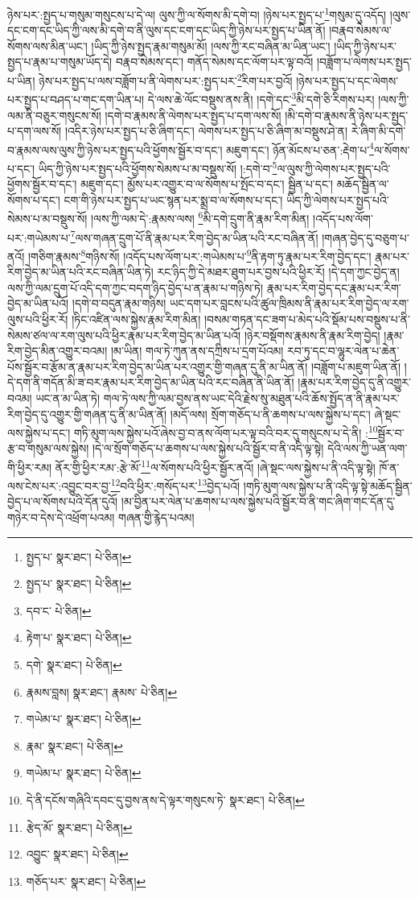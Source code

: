 ཉེས་པར་:སྤྱད་པ་གསུམ་གསུངས་པ་དེ་ལ། ལུས་ཀྱི་ལ་སོགས་མི་དགེ་བ། །ཉེས་པར་སྤྱད་པ་\footnote{སྤྱད་པ་  སྣར་ཐང་།  པེ་ཅིན། }གསུམ་དུ་འདོད། །ལུས་དང་ངག་དང་ཡིད་ཀྱི་ལས་མི་དགེ་བ་ནི་ལུས་དང་ངག་དང་ཡིད་ཀྱི་ཉེས་པར་སྤྱད་པ་ཡིན་ནོ། །བརྣབ་སེམས་ལ་སོགས་ལས་མིན་ཡང་། །ཡིད་ཀྱི་ཉེས་སྤྱད་རྣམ་གསུམ་མོ། །ལས་ཀྱི་རང་བཞིན་མ་ཡིན་ཡང་། །ཡིད་ཀྱི་ཉེས་པར་སྤྱད་པ་རྣམ་པ་གསུམ་ཡོད་དེ། བརྣབ་སེམས་དང་། གནོད་སེམས་དང་ལོག་པར་ལྟ་བའོ། །བཟློག་པ་ལེགས་པར་སྤྱད་པ་ཡིན། ཉེས་པར་སྤྱད་པ་ལས་བཟློག་པ་ནི་ལེགས་པར་:སྤྱད་པར་\footnote{སྤྱད་པ་  སྣར་ཐང་།  པེ་ཅིན། }རིག་པར་བྱའོ། །ཉེས་པར་སྤྱད་པ་དང་ལེགས་པར་སྤྱད་པ་བཤད་པ་གང་དག་ཡིན་པ། དེ་ལས་ཆེ་ལོང་བསྡུས་ནས་ནི། །དགེ་དང་\footnote{དབ་ང་  པེ་ཅིན། }མི་དགེ་ཅི་རིགས་པར། །ལས་ཀྱི་ལམ་ནི་བཅུར་གསུངས་སོ། །དགེ་བ་རྣམས་ནི་ལེགས་པར་སྤྱད་པ་དག་ལས་སོ། །མི་དགེ་བ་རྣམས་ནི་ཉེས་པར་སྤྱད་པ་དག་ལས་སོ། །འདིར་ཉེས་པར་སྤྱད་པ་ཅི་ཞིག་དང་། ལེགས་པར་སྤྱད་པ་ཅི་ཞིག་མ་བསྡུས་ཤེ་ན། རེ་ཞིག་མི་དགེ་བ་རྣམས་ལས་ལུས་ཀྱི་ཉེས་པར་སྤྱད་པའི་ཕྱོགས་སྦྱོར་བ་དང་། མཇུག་དང་། ཉོན་མོངས་པ་ཅན་:རྡེག་པ་\footnote{རྟེག་པ་  སྣར་ཐང་།  པེ་ཅིན། }ལ་སོགས་པ་དང་། ཡིད་ཀྱི་ཉེས་པར་སྤྱད་པའི་ཕྱོགས་སེམས་པ་མ་བསྡུས་སོ། །:དགེ་བ་\footnote{དགེ་  སྣར་ཐང་།  པེ་ཅིན། }ལ་ལུས་ཀྱི་ལེགས་པར་སྤྱད་པའི་ཕྱོགས་སྦྱོར་བ་དང་། མཇུག་དང་། མྱོས་པར་འགྱུར་བ་ལ་སོགས་པ་སྤོང་བ་དང་། སྦྱིན་པ་དང་། མཆོད་སྦྱིན་ལ་སོགས་པ་དང་། ངག་གི་ཉེས་པར་སྤྱད་པ་ཡང་སྙན་པར་སྨྲ་བ་ལ་སོགས་པ་དང་། ཡིད་ཀྱི་ལེགས་པར་སྤྱད་པའི་སེམས་པ་མ་བསྡུས་སོ། །ལས་ཀྱི་ལམ་དེ་:རྣམས་ལས། \footnote{རྣམས་བླས།   སྣར་ཐང་། རྣམས་  པེ་ཅིན། }མི་དགེ་དྲུག་ནི་རྣམ་རིག་མིན། །འདོད་པས་ལོག་པར་:གཡེམས་པ་\footnote{གཡེམ་པ་  སྣར་ཐང་།  པེ་ཅིན། }ལས་གཞན་དྲུག་པོ་ནི་རྣམ་པར་རིག་བྱེད་མ་ཡིན་པའི་རང་བཞིན་ནོ། །གཞན་བྱེད་དུ་བཅུག་པ་ནའོ། །གཅིག་རྣམས་\footnote{རྣམ་  སྣར་ཐང་།  པེ་ཅིན། }གཉིས་སོ། །འདོད་པས་ལོག་པར་:གཡེམས་པ་\footnote{གཡེམ་པ་  སྣར་ཐང་།  པེ་ཅིན། }ནི་རྟག་ཏུ་རྣམ་པར་རིག་བྱེད་དང་། རྣམ་པར་རིག་བྱེད་མ་ཡིན་པའི་རང་བཞིན་ཡིན་ཏེ། རང་ཉིད་ཀྱི་དེ་མཐར་ཐུག་པར་བྱས་པའི་ཕྱིར་རོ། །དེ་དག་ཀྱང་བྱེད་ན། ལས་ཀྱི་ལམ་དྲུག་པོ་འདི་དག་ཀྱང་བདག་ཉིད་བྱེད་པ་ན་རྣམ་པ་གཉིས་ཏེ། རྣམ་པར་རིག་བྱེད་དང་རྣམ་པར་རིག་བྱེད་མ་ཡིན་པའོ། །དགེ་བ་བདུན་རྣམ་གཉིས། ཡང་དག་པར་བླངས་པའི་ཚུལ་ཁྲིམས་ནི་རྣམ་པར་རིག་བྱེད་ལ་རག་ལུས་པའི་ཕྱིར་རོ། །ཏིང་འཛིན་ལས་སྐྱེས་རྣམ་རིག་མིན། །བསམ་གཏན་དང་ཟག་པ་མེད་པའི་སྡོམ་པས་བསྡུས་པ་ནི་སེམས་ཙལ་ལ་རག་ལུས་པའི་ཕྱིར་རྣམ་པར་རིག་བྱེད་མ་ཡིན་པའོ། །ཉེར་བསྡོགས་རྣམས་ནི་རྣམ་རིག་བྱེད། །རྣམ་རིག་བྱེད་མིན་འགྱུར་བའམ། །མ་ཡིན། གལ་ཏེ་ཀུན་ནས་དཀྲིས་པ་དྲག་པོའམ། རབ་ཏུ་དང་བ་ལྷུར་ལེན་པ་ཆེན་པོས་སྦྱོར་བ་རྩོམ་ན་རྣམ་པར་རིག་བྱེད་མ་ཡིན་པར་འགྱུར་གྱི་གཞན་དུ་ནི་མ་ཡིན་ནོ། །བཟློག་པ་མཇུག་ཡིན་ནོ། །དེ་དག་ནི་གདོན་མི་ཟ་བར་རྣམ་པར་རིག་བྱེད་མ་ཡིན་པའི་རང་བཞིན་ནི་ཡིན་ནོ། །རྣམ་པར་རིག་བྱེད་དུ་ནི་འགྱུར་བའམ། ཡང་ན་མ་ཡིན་ཏེ། གལ་ཏེ་ལས་ཀྱི་ལམ་བྱས་ནས་ཡང་དེའི་རྗེས་སུ་མཐུན་པའི་ཆོས་སྤྱོད་ན་ནི་རྣམ་པར་རིག་བྱེད་དུ་འགྱུར་གྱི་གཞན་དུ་ནི་མ་ཡིན་ནོ། །མདོ་ལས། སྲོག་གཅོད་པ་ནི་ཆགས་པ་ལས་སྐྱེས་པ་དང་། ཞེ་སྡང་ལས་སྐྱེས་པ་དང་། གཏི་མུག་ལས་སྐྱེས་པའོ་ཞེས་བྱ་བ་ནས་ལོག་པར་ལྟ་བའི་བར་དུ་གསུངས་པ་དེ་ནི། :\footnote{དེ་ནི་དངོས་གཞིའི་དབང་དུ་བྱས་ནས་དེ་ལྟར་གསུངས་ཏེ་  སྣར་ཐང་།  པེ་ཅིན། }སྦྱོར་བ་རྩ་བ་གསུམ་ལས་སྐྱེས། །དེ་ལ་སྲོག་གཅོད་པ་ཆགས་པ་ལས་སྐྱེས་པའི་སྦྱོར་བ་ནི་འདི་ལྟ་སྟེ། དེའི་ལས་ཀྱི་ཡན་ལག་གི་ཕྱིར་རམ། ནོར་གྱི་ཕྱིར་རམ་:རྩེ་མོ་\footnote{རྩེད་མོ་  སྣར་ཐང་།  པེ་ཅིན། }ལ་སོགས་པའི་ཕྱིར་སྦྱོར་ནའོ། །ཞེ་སྡང་ལས་སྐྱེས་པ་ནི་འདི་ལྟ་སྟེ། ཁོ་ན་ལས་ངེས་པར་:འབྱུང་བར་བྱ་\footnote{འབྱུང་  སྣར་ཐང་།  པེ་ཅིན། }བའི་ཕྱིར་:གསོད་པར་\footnote{གཅོད་པར་  སྣར་ཐང་།  པེ་ཅིན། }བྱེད་པའོ། །གཏི་མུག་ལས་སྐྱེས་པ་ནི་འདི་ལྟ་སྟེ་མཆོད་སྦྱིན་བྱེད་པ་ལ་སོགས་པའི་དོན་དུའོ། །མ་བྱིན་པར་ལེན་པ་ཆགས་པ་ལས་སྐྱེས་པའི་སྦྱོར་བ་ནི་གང་ཞིག་གང་དོན་དུ་གཉེར་བ་དེས་དེ་འཕྲོག་པའམ། གཞན་གྱི་རྙེད་པའམ། 